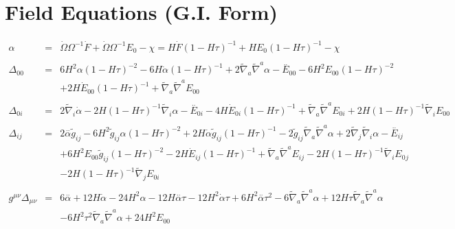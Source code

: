 \documentclass[10pt,letterpaper]{article}
\numberwithin{equation}{section}
\begin{document}
\section{Field Equations (G.I. Form)}
\begin{eqnarray}
\alpha &=& \dot\Omega \Omega^{-1} \dot F + \dot\Omega \Omega^{-1}E_0 - \chi 
= H \dot{F} (1 -  H \tau)^{-1} + H E_{0}{} (1 -  H \tau)^{-1} -  \chi 
\\ \nonumber\\
\Delta_{00}&=& 6 H^2 \alpha (1 -  H \tau)^{-2} - 6 H \dot{\alpha} (1 -  H \tau)^{-1} + 2 \tilde{\nabla}_{a}\tilde{\nabla}^{a}\alpha - \overset{..}{E}_{00}{} - 6 H^2 E_{00}{} (1 -  H \tau)^{-2} \nonumber \\ 
&& + 2 H \dot{E}_{00}{} (1 -  H \tau)^{-1} + \tilde{\nabla}_{a}\tilde{\nabla}^{a}E_{00}{}
\\  \nonumber\\ 
\Delta_{0i}&=& 2 \tilde{\nabla}_{i}\dot{\alpha} - 2 H (1 -  H \tau)^{-1} \tilde{\nabla}_{i}\alpha - \overset{..}{E}_{0i}{} - 4 H \dot{E}_{0i}{} (1 -  H \tau)^{-1} + \tilde{\nabla}_{a}\tilde{\nabla}^{a}E_{0i}{} + 2 H (1 -  H \tau)^{-1} \tilde{\nabla}_{i}E_{00}{}
\\  \nonumber\\ 
\Delta_{ij}&=& 2 \overset{..}{\alpha} \tilde{g}_{ij} - 6 H^2 \tilde{g}_{ij} \alpha (1 -  H \tau)^{-2} + 2 H \dot{\alpha} \tilde{g}_{ij} (1 -  H \tau)^{-1} - 2 \tilde{g}_{ij} \tilde{\nabla}_{a}\tilde{\nabla}^{a}\alpha + 2 \tilde{\nabla}_{j}\tilde{\nabla}_{i}\alpha - \overset{..}{E}_{ij} \nonumber \\ 
&& + 6 H^2 E_{00}{} \tilde{g}_{ij} (1 -  H \tau)^{-2} - 2 H \dot{E}_{ij} (1 -  H \tau)^{-1} + \tilde{\nabla}_{a}\tilde{\nabla}^{a}E_{ij} - 2 H (1 -  H \tau)^{-1} \tilde{\nabla}_{i}E_{0}{}_{j} \nonumber \\ 
&& - 2 H (1 -  H \tau)^{-1} \tilde{\nabla}_{j}E_{0i}{}
\\  \nonumber\\ 
g^{\mu\nu}\Delta_{\mu\nu}&=& 6 \overset{..}{\alpha} + 12 H \dot{\alpha} - 24 H^2 \alpha - 12 H \overset{..}{\alpha} \tau - 12 H^2 \dot{\alpha} \tau + 6 H^2 \overset{..}{\alpha} \tau^2 - 6 \tilde{\nabla}_{a}\tilde{\nabla}^{a}\alpha + 12 H \tau \tilde{\nabla}_{a}\tilde{\nabla}^{a}\alpha \nonumber \\ 
&& - 6 H^2 \tau^2 \tilde{\nabla}_{a}\tilde{\nabla}^{a}\alpha +24 H^2 E_{00}{}
\end{eqnarray}
\end{document}
